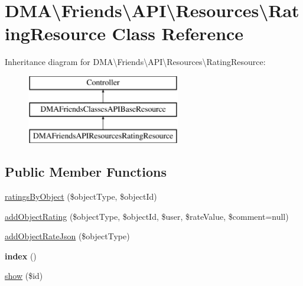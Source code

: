 \hypertarget{classDMA_1_1Friends_1_1API_1_1Resources_1_1RatingResource}{}\section{D\+M\+A\textbackslash{}Friends\textbackslash{}A\+P\+I\textbackslash{}Resources\textbackslash{}Rating\+Resource Class Reference}
\label{classDMA_1_1Friends_1_1API_1_1Resources_1_1RatingResource}
Inheritance diagram for D\+M\+A\textbackslash{}Friends\textbackslash{}A\+P\+I\textbackslash{}Resources\textbackslash{}Rating\+Resource\+:\begin{figure}[H]
\begin{center}
\leavevmode
\includegraphics[height=3.000000cm]{d7/de0/classDMA_1_1Friends_1_1API_1_1Resources_1_1RatingResource}
\end{center}
\end{figure}
\subsection*{Public Member Functions}
\begin{DoxyCompactItemize}
\item 
\hyperlink{classDMA_1_1Friends_1_1API_1_1Resources_1_1RatingResource_a6cb4a4bb619ebf9cf82fda96892de587}{ratings\+By\+Object} (\$object\+Type, \$object\+Id)
\item 
\hyperlink{classDMA_1_1Friends_1_1API_1_1Resources_1_1RatingResource_a5a3342dbcaa4eda48599922fca2dca97}{add\+Object\+Rating} (\$object\+Type, \$object\+Id, \$user, \$rate\+Value, \$comment=null)
\item 
\hyperlink{classDMA_1_1Friends_1_1API_1_1Resources_1_1RatingResource_a5f73df541d7ca7a1fa30b30278e38b67}{add\+Object\+Rate\+Json} (\$object\+Type)
\item 
\hypertarget{classDMA_1_1Friends_1_1API_1_1Resources_1_1RatingResource_a4a39636d2b996936fddfeeb7329ab143}{}{\bfseries index} ()\label{classDMA_1_1Friends_1_1API_1_1Resources_1_1RatingResource_a4a39636d2b996936fddfeeb7329ab143}

\item 
\hyperlink{classDMA_1_1Friends_1_1API_1_1Resources_1_1RatingResource_a5c4a159d0098e19f8b872b0bb73875bf}{show} (\$id)
\end{DoxyCompactItemize}
